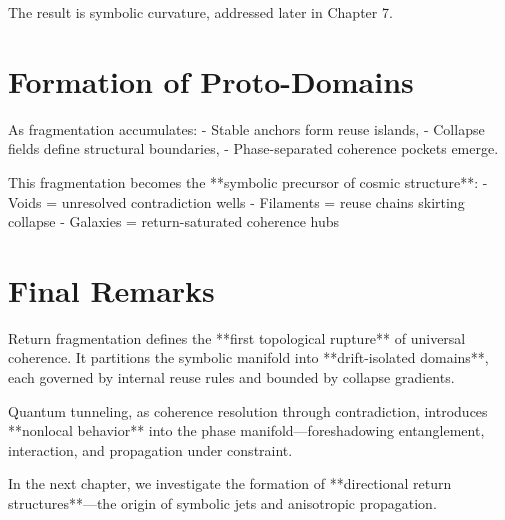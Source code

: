 The result is symbolic curvature, addressed later in Chapter 7.

\section{Formation of Proto-Domains}

As fragmentation accumulates:
- Stable anchors form reuse islands,
- Collapse fields define structural boundaries,
- Phase-separated coherence pockets emerge.

This fragmentation becomes the **symbolic precursor of cosmic structure**:
- Voids = unresolved contradiction wells
- Filaments = reuse chains skirting collapse
- Galaxies = return-saturated coherence hubs

\section{Final Remarks}

Return fragmentation defines the **first topological rupture** of universal coherence. It partitions the symbolic manifold into **drift-isolated domains**, each governed by internal reuse rules and bounded by collapse gradients.

Quantum tunneling, as coherence resolution through contradiction, introduces **nonlocal behavior** into the phase manifold—foreshadowing entanglement, interaction, and propagation under constraint.

In the next chapter, we investigate the formation of **directional return structures**—the origin of symbolic jets and anisotropic propagation.
